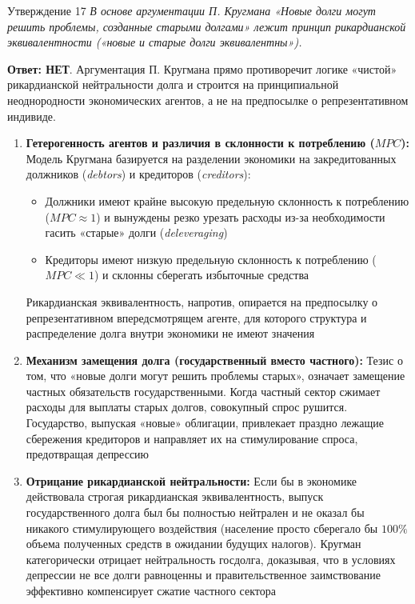 \documentclass[10pt,a4paper]{article}
\newcommand{\qnet}{\textbf{\color{nored}Ответ: НЕТ}}
\newenvironment{answer}[2]{%
  \begin{qbox}{Утверждение #1}
  \textit{#2}\par\smallskip
}{%
  \end{qbox}\vspace{2pt}
}
\begin{document}
\begin{answer}{17}{В основе аргументации П. Кругмана «Новые долги могут решить проблемы, созданные старыми долгами» лежит принцип рикардианской эквивалентности («новые и старые долги эквивалентны»).}
\qnet. Аргументация П. Кругмана прямо противоречит логике «чистой» рикардианской нейтральности долга и строится на принципиальной неоднородности экономических агентов, а не на предпосылке о репрезентативном индивиде.

\begin{enumerate}
    \item \textbf{Гетерогенность агентов и различия в склонности к потреблению ($MPC$):}
    Модель Кругмана базируется на разделении экономики на закредитованных должников (\textit{debtors}) и кредиторов (\textit{creditors}):
    \begin{itemize}
        \item Должники имеют крайне высокую предельную склонность к потреблению ($MPC \approx 1$) и вынуждены резко урезать расходы из-за необходимости гасить «старые» долги (\textit{deleveraging})
        \item Кредиторы имеют низкую предельную склонность к потреблению ($MPC \ll 1$) и склонны сберегать избыточные средства
    \end{itemize}
    Рикардианская эквивалентность, напротив, опирается на предпосылку о репрезентативном впередсмотрящем агенте, для которого структура и распределение долга внутри экономики не имеют значения

    \item \textbf{Механизм замещения долга (государственный вместо частного):}
    Тезис о том, что «новые долги могут решить проблемы старых», означает замещение частных обязательств государственными. Когда частный сектор сжимает расходы для выплаты старых долгов, совокупный спрос рушится. Государство, выпуская «новые» облигации, привлекает праздно лежащие сбережения кредиторов и направляет их на стимулирование спроса, предотвращая депрессию

    \item \textbf{Отрицание рикардианской нейтральности:}
    Если бы в экономике действовала строгая рикардианская эквивалентность, выпуск государственного долга был бы полностью нейтрален и не оказал бы никакого стимулирующего воздействия (население просто сберегало бы $100\%$ объема полученных средств в ожидании будущих налогов). Кругман категорически отрицает нейтральность госдолга, доказывая, что в условиях депрессии не все долги равноценны и правительственное заимствование эффективно компенсирует сжатие частного сектора
\end{enumerate}
\end{answer}
\end{document}
